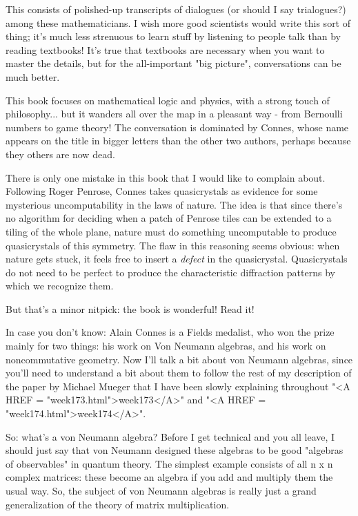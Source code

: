 This consists of polished-up transcripts of dialogues (or should I 
say trialogues?) among these mathematicians.  I wish more good scientists 
would write this sort of thing; it's much less strenuous to learn stuff 
by listening to people talk than by reading textbooks!  It's true that
textbooks are necessary when you want to master the details, but for 
the all-important "big picture", conversations can be much better.  

This book focuses on mathematical logic and physics, with a strong touch 
of philosophy... but it wanders all over the map in a pleasant way - from 
Bernoulli numbers to game theory!  The conversation is dominated by 
Connes, whose name appears on the title in bigger letters than the other 
two authors, perhaps because they others are now dead.

There is only one mistake in this book that I would like to complain 
about.  Following Roger Penrose, Connes takes quasicrystals as evidence 
for some mysterious uncomputability in the laws of nature.  The idea 
is that since there's no algorithm for deciding when a patch of Penrose 
tiles can be extended to a tiling of the whole plane, nature must do 
something uncomputable to produce quasicrystals of this symmetry.  The 
flaw in this reasoning seems obvious: when nature gets stuck, it feels 
free to insert a \emph{defect} in the quasicrystal.  Quasicrystals do not 
need to be perfect to produce the characteristic diffraction patterns by 
which we recognize them.  

But that's a minor nitpick: the book is wonderful!  Read it!

In case you don't know: Alain Connes is a Fields medalist, who won the
prize mainly for two things: his work on Von Neumann algebras, and his
work on noncommutative geometry.  Now I'll talk a bit about von Neumann
algebras, since you'll need to understand a bit about them to follow the
rest of my description of the paper by Michael Mueger that I have
been slowly explaining throughout "<A HREF = "week173.html">week173</A>" and "<A HREF = "week174.html">week174</A>".  


So: what's a von Neumann algebra?  Before I get technical and you all
leave, I should just say that von Neumann designed these algebras to be
good "algebras of observables" in quantum theory.  The
simplest example consists of all n x n complex matrices: these become an
algebra if you add and multiply them the usual way.  So, the subject of
von Neumann algebras is really just a grand generalization of the theory
of matrix multiplication.

